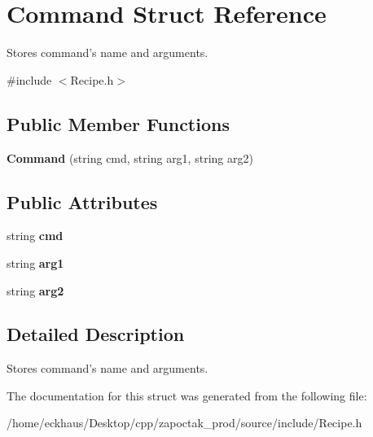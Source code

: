 \hypertarget{structCommand}{\section{Command Struct Reference}
\label{structCommand}
}


Stores command's name and arguments.  




{\ttfamily \#include $<$Recipe.\-h$>$}

\subsection*{Public Member Functions}
\begin{DoxyCompactItemize}
\item 
\hypertarget{structCommand_ad5baf9209de07797e8f6525a8d8b5eee}{{\bfseries Command} (string cmd, string arg1, string arg2)}\label{structCommand_ad5baf9209de07797e8f6525a8d8b5eee}

\end{DoxyCompactItemize}
\subsection*{Public Attributes}
\begin{DoxyCompactItemize}
\item 
\hypertarget{structCommand_aff4def5cb9cabcb8b719ccb472c527f5}{string {\bfseries cmd}}\label{structCommand_aff4def5cb9cabcb8b719ccb472c527f5}

\item 
\hypertarget{structCommand_af859040272fe89b1640db987bf06d535}{string {\bfseries arg1}}\label{structCommand_af859040272fe89b1640db987bf06d535}

\item 
\hypertarget{structCommand_a415cd7a04e524df881e49d35cf0d5d09}{string {\bfseries arg2}}\label{structCommand_a415cd7a04e524df881e49d35cf0d5d09}

\end{DoxyCompactItemize}


\subsection{Detailed Description}
Stores command's name and arguments. 

The documentation for this struct was generated from the following file\-:\begin{DoxyCompactItemize}
\item 
/home/eckhaus/\-Desktop/cpp/zapoctak\-\_\-prod/source/include/Recipe.\-h\end{DoxyCompactItemize}
